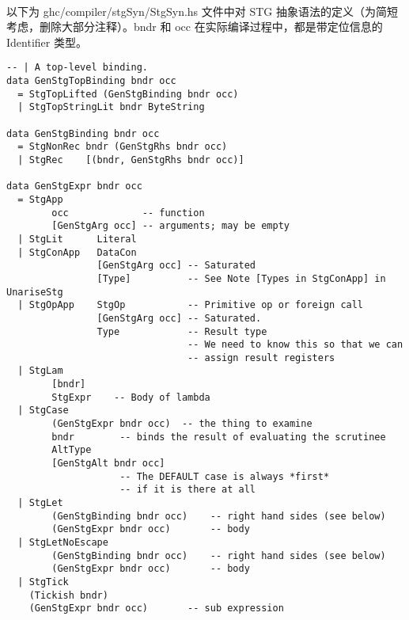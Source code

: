 \documentclass{article}
\begin{document}
	\paragraph{}
	以下为 ghc/compiler/stgSyn/StgSyn.hs 文件中对 STG 抽象语法的定义（为简短考虑，删除大部分注释）。bndr 和 occ 在实际编译过程中，都是带定位信息的 Identifier 类型。
\begin{verbatim}
-- | A top-level binding.
data GenStgTopBinding bndr occ
  = StgTopLifted (GenStgBinding bndr occ)
  | StgTopStringLit bndr ByteString

data GenStgBinding bndr occ
  = StgNonRec bndr (GenStgRhs bndr occ)
  | StgRec    [(bndr, GenStgRhs bndr occ)]

data GenStgExpr bndr occ
  = StgApp
        occ             -- function
        [GenStgArg occ] -- arguments; may be empty
  | StgLit      Literal
  | StgConApp   DataCon
                [GenStgArg occ] -- Saturated
                [Type]          -- See Note [Types in StgConApp] in UnariseStg
  | StgOpApp    StgOp           -- Primitive op or foreign call
                [GenStgArg occ] -- Saturated.
                Type            -- Result type
                                -- We need to know this so that we can
                                -- assign result registers
  | StgLam
        [bndr]
        StgExpr    -- Body of lambda
  | StgCase
        (GenStgExpr bndr occ)  -- the thing to examine
        bndr        -- binds the result of evaluating the scrutinee
        AltType
        [GenStgAlt bndr occ]
                    -- The DEFAULT case is always *first*
                    -- if it is there at all
  | StgLet
        (GenStgBinding bndr occ)    -- right hand sides (see below)
        (GenStgExpr bndr occ)       -- body
  | StgLetNoEscape
        (GenStgBinding bndr occ)    -- right hand sides (see below)
        (GenStgExpr bndr occ)       -- body
  | StgTick
    (Tickish bndr)
    (GenStgExpr bndr occ)       -- sub expression
\end{verbatim}
\end{document}
